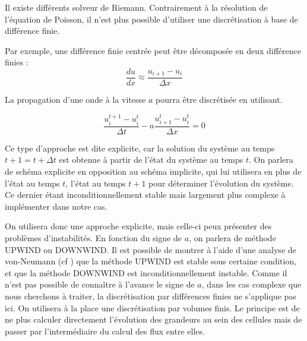 Il existe différents solveur de Riemann.
Contrairement à la résolution de l’équation de Poisson, il n'est plus possible d'utiliser une discrétisation à base de différence finie.

Par exemple, une différence finie centrée peut être décomposée en deux différence finies : 
\begin{equation}
\frac{d u}{dx} \approx \frac{u_{i+1}  - u_i}{\Delta x} 
\end{equation}

La propagation d'une onde à la vitesse $a$ pourra être discrétisée en utilisant.

\begin{equation}
\frac{u_i^{t+1} - u_i^t }{\Delta t} - a \frac{u_{i+1}^t  - u_i^t}{\Delta x} = 0
\end{equation}

Ce type d'approche est dite explicite, car la solution du système au temps $t+1=t+\Delta t$ est obtenue à partir de l'état du système au temps $t$.
On parlera de schéma explicite en opposition au schéma implicite, qui lui utilisera en plus de l'état au temps $t$, l'état au temps $t+1$ pour déterminer l'évolution du système.
Ce dernier étant inconditionnellement stable mais largement plus complexe à implémenter dans notre cas.

On utilisera donc une approche explicite, mais celle-ci peux présenter des problèmes d'instabilités.
En fonction du signe de $a$, on parlera de méthode UPWIND ou DOWNWIND.
Il est possible de montrer à l'aide d'une analyse de von-Neumann (cf \cite{toro1999riemann}) que la méthode UPWIND est stable sous certaine condition, et que la méthode DOWNWIND est inconditionnellement instable.
Comme il n'est pas possible de connaître à l'avance le signe de $a$, dans les cas complexe que nous cherchons à traiter, la discrétisation par différences finies ne s'applique pas ici. 
On utilisera à la place une discrétisation par volumes finis.
Le principe est de ne plus calculer directement l'évolution des grandeurs au sein des cellules mais de passer par l'intermédiaire du calcul des flux entre elles.

